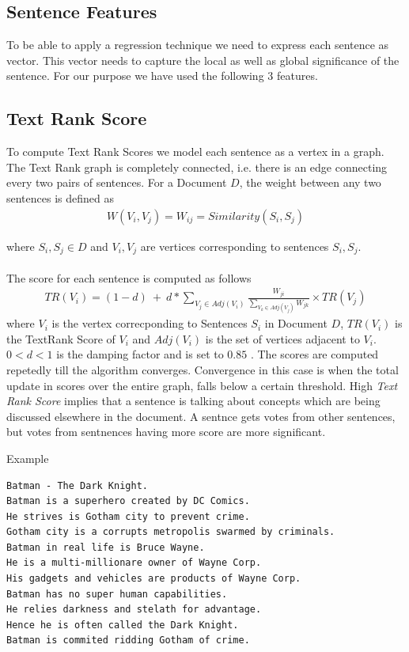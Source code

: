 \documentclass[paper=a4, fontsize=11pt]{scrartcl} %
\numberwithin{equation}{section} %
\numberwithin{figure}{section} %
\numberwithin{table}{section} %
\begin{document}
\subsection{Sentence Features}
To be able to apply a regression technique we need to express each sentence as vector. This vector needs to capture the local as well as global significance of the sentence. For our purpose we have used the following 3 features.

\subsection{Text Rank Score}
To compute Text Rank Scores \cite{textrank} we model each sentence as a vertex in a graph. The Text Rank graph is completely connected, i.e. there is an edge connecting every two pairs of sentences. For a Document $D$, the weight between any two sentences is defined as 
\begin{align}
W( V_i,V_j) = W_{ij} = Similarity(S_i,S_j)
\end{align}

where $S_i,S_j \in D$  and $V_i,V_j$ are vertices corresponding to sentences $S_i,S_j$.\\
\\
The score for each sentence is computed as follows
\begin{align}
TR(V_i) = (1 - d)\ +\ d*\sum\limits_{V_j \in Adj(V_i)} \frac{W_{ji}}{\sum\limits_{V_k \in Adj(V_j)} W_{jk}} \times TR(V_j)
\end{align}
where $V_i$ is the vertex correcponding to Sentences $S_i$ in Document $D$, $TR(V_i)$ is the TextRank Score of $V_i$ and $Adj(V_i)$ is the set of vertices adjacent to $V_i$. $0 < d < 1$ is the damping factor and is set to $0.85$ \cite{brin}. The scores are computed repetedly till the algorithm converges. Convergence in this case is when the total update in scores over the entire graph, falls below a certain threshold. High \emph{Text Rank Score} implies that a sentence is talking about concepts which are being discussed elsewhere in the document. A sentnce gets votes from other sentences, but votes from sentnences having more score are more significant.\\
\par
{\large Example}
\begin{lstlisting}
Batman - The Dark Knight.
Batman is a superhero created by DC Comics.
He strives is Gotham city to prevent crime.
Gotham city is a corrupts metropolis swarmed by criminals.
Batman in real life is Bruce Wayne.
He is a multi-millionare owner of Wayne Corp.
His gadgets and vehicles are products of Wayne Corp.
Batman has no super human capabilities.
He relies darkness and stelath for advantage.
Hence he is often called the Dark Knight.
Batman is commited ridding Gotham of crime.
\end{lstlisting}  
\end{document}
